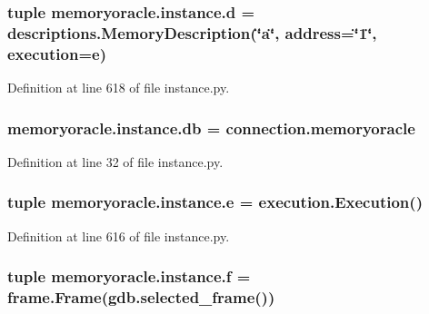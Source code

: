 \subsubsection[{d}]{\setlength{\rightskip}{0pt plus 5cm}tuple memoryoracle.\+instance.\+d = {\bf descriptions.\+Memory\+Description}(\char`\"{}a\char`\"{}, address=\char`\"{}1\char`\"{}, execution={\bf e})}\label{namespacememoryoracle_1_1instance_a50bbc043ba350bab4859e973b833b71f}


Definition at line 618 of file instance.\+py.

\hypertarget{namespacememoryoracle_1_1instance_ad0b99030c18c65a87129ed0c8a7d3b2e}{}
\subsubsection[{db}]{\setlength{\rightskip}{0pt plus 5cm}memoryoracle.\+instance.\+db = connection.\+memoryoracle}\label{namespacememoryoracle_1_1instance_ad0b99030c18c65a87129ed0c8a7d3b2e}


Definition at line 32 of file instance.\+py.

\hypertarget{namespacememoryoracle_1_1instance_a8337088b8d0f8b6a58174f7b6a624d9e}{}
\subsubsection[{e}]{\setlength{\rightskip}{0pt plus 5cm}tuple memoryoracle.\+instance.\+e = {\bf execution.\+Execution}()}\label{namespacememoryoracle_1_1instance_a8337088b8d0f8b6a58174f7b6a624d9e}


Definition at line 616 of file instance.\+py.

\hypertarget{namespacememoryoracle_1_1instance_a29d678ee2f2624880e57ee0ee498e793}{}
\subsubsection[{f}]{\setlength{\rightskip}{0pt plus 5cm}tuple memoryoracle.\+instance.\+f = {\bf frame.\+Frame}(gdb.\+selected\+\_\+frame())}\label{namespacememoryoracle_1_1instance_a29d678ee2f2624880e57ee0ee498e793}


